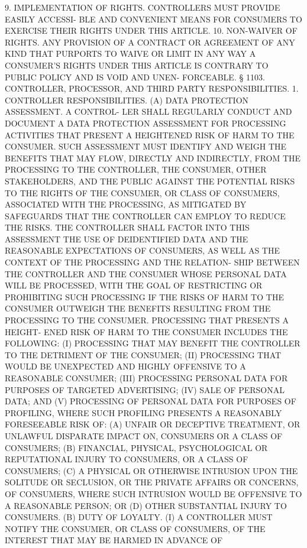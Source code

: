    9. IMPLEMENTATION OF RIGHTS. CONTROLLERS MUST PROVIDE EASILY  ACCESSI-
 BLE  AND  CONVENIENT  MEANS FOR CONSUMERS TO EXERCISE THEIR RIGHTS UNDER
 THIS ARTICLE.
   10.  NON-WAIVER OF RIGHTS. ANY PROVISION OF A CONTRACT OR AGREEMENT OF
 ANY KIND THAT PURPORTS TO WAIVE OR LIMIT IN ANY WAY A CONSUMER'S  RIGHTS
 UNDER  THIS  ARTICLE  IS CONTRARY TO PUBLIC POLICY AND IS VOID AND UNEN-
 FORCEABLE.
   § 1103.  CONTROLLER, PROCESSOR, AND THIRD PARTY  RESPONSIBILITIES.  1.
 CONTROLLER  RESPONSIBILITIES. (A) DATA PROTECTION ASSESSMENT. A CONTROL-
 LER SHALL REGULARLY CONDUCT AND DOCUMENT A  DATA  PROTECTION  ASSESSMENT
 FOR  PROCESSING ACTIVITIES THAT PRESENT A HEIGHTENED RISK OF HARM TO THE
 CONSUMER. SUCH ASSESSMENT MUST IDENTIFY AND WEIGH THE BENEFITS THAT  MAY
 FLOW,  DIRECTLY  AND  INDIRECTLY, FROM THE PROCESSING TO THE CONTROLLER,
 THE CONSUMER, OTHER STAKEHOLDERS, AND THE PUBLIC AGAINST  THE  POTENTIAL
 RISKS  TO  THE RIGHTS OF THE CONSUMER, OR CLASS OF CONSUMERS, ASSOCIATED
 WITH THE PROCESSING, AS MITIGATED BY SAFEGUARDS THAT THE CONTROLLER  CAN
 EMPLOY  TO  REDUCE  THE  RISKS.  THE  CONTROLLER  SHALL FACTOR INTO THIS
 ASSESSMENT THE USE OF DEIDENTIFIED DATA AND THE REASONABLE  EXPECTATIONS
 OF CONSUMERS, AS WELL AS THE CONTEXT OF THE PROCESSING AND THE RELATION-
 SHIP BETWEEN THE CONTROLLER AND THE CONSUMER WHOSE PERSONAL DATA WILL BE
 PROCESSED,  WITH  THE GOAL OF RESTRICTING OR PROHIBITING SUCH PROCESSING
 IF THE RISKS OF HARM TO THE CONSUMER  OUTWEIGH  THE  BENEFITS  RESULTING
 FROM THE PROCESSING TO THE CONSUMER.  PROCESSING THAT PRESENTS A HEIGHT-
 ENED RISK OF HARM TO THE CONSUMER INCLUDES THE FOLLOWING:
   (I) PROCESSING THAT MAY BENEFIT THE CONTROLLER TO THE DETRIMENT OF THE
 CONSUMER;
   (II)  PROCESSING  THAT  WOULD  BE UNEXPECTED AND HIGHLY OFFENSIVE TO A
 REASONABLE CONSUMER;
   (III) PROCESSING PERSONAL DATA FOR PURPOSES OF TARGETED ADVERTISING;
   (IV) SALE OF PERSONAL DATA; AND
   (V) PROCESSING OF PERSONAL DATA FOR PURPOSES OF PROFILING, WHERE  SUCH
 PROFILING PRESENTS A REASONABLY FORESEEABLE RISK OF:
   (A)  UNFAIR  OR  DECEPTIVE TREATMENT, OR UNLAWFUL DISPARATE IMPACT ON,
 CONSUMERS OR A CLASS OF CONSUMERS;
   (B) FINANCIAL,  PHYSICAL,  PSYCHOLOGICAL  OR  REPUTATIONAL  INJURY  TO
 CONSUMERS, OR A CLASS OF CONSUMERS;
   (C)  A PHYSICAL OR OTHERWISE INTRUSION UPON THE SOLITUDE OR SECLUSION,
 OR THE PRIVATE AFFAIRS OR CONCERNS, OF CONSUMERS, WHERE  SUCH  INTRUSION
 WOULD BE OFFENSIVE TO A REASONABLE PERSON; OR
   (D) OTHER SUBSTANTIAL INJURY TO CONSUMERS.
   (B)  DUTY  OF  LOYALTY.  (I) A CONTROLLER MUST NOTIFY THE CONSUMER, OR
 CLASS OF CONSUMERS, OF THE INTEREST THAT MAY BE  HARMED  IN  ADVANCE  OF
